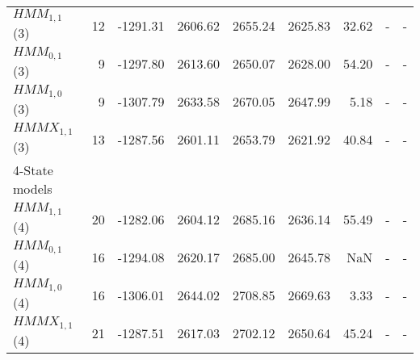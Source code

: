 \documentclass[11pt,a4paper,oneside]{article}
\begin{document}
\begin{table}[h!]
\begin{tabular}{lrrrrrrrr}
\hspace{3mm}$HMM_{1,1}$(3) & 12 & -1291.31 & 2606.62 & 2655.24 & 2625.83 & 32.62 & - & -  \\

\hspace{3mm}$HMM_{0,1}$(3) & 9 & -1297.80 & 2613.60 & 2650.07 & 2628.00 & 54.20 & - & -  \\

\hspace{3mm}$HMM_{1,0}$(3) & 9 & -1307.79 & 2633.58 & 2670.05 & 2647.99 & 5.18 & - & -  \\

\hspace{3mm}$HMMX_{1,1}$(3)& 13 & -1287.56 & 2601.11 & 2653.79 & 2621.92 & 40.84 & - & -  \\

4-State models & & & & & & &  \\ 

\hspace{3mm}$HMM_{1,1}$(4) & 20 & -1282.06 & 2604.12 & 2685.16 & 2636.14
 & 55.49 & - & - \\

\hspace{3mm}$HMM_{0,1}$(4) & 16 & -1294.08 & 2620.17 & 2685.00 & 2645.78 & NaN & - & - \\

\hspace{3mm}$HMM_{1,0}$(4) & 16 & -1306.01 & 2644.02 & 2708.85 & 2669.63 & 3.33 & - & - \\

\hspace{3mm}$HMMX_{1,1}$(4)& 21 & -1287.51 & 2617.03 & 2702.12 & 2650.64 & 45.24 & - & -  \\






\end{tabular}
\end{table}
\end{document}
